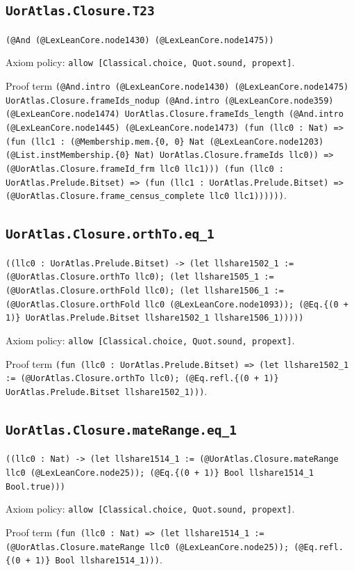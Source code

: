 \documentclass[11pt]{article}
\begin{document}
\subsection*{\texttt{UorAtlas.Closure.T23}}
\noindent\texttt{(@And (@LexLeanCore.node1430) (@LexLeanCore.node1475))}\par
\noindent Axiom policy: \texttt{allow [Classical.choice, Quot.sound, propext]}.\par
\noindent Proof term \texttt{(@And.intro (@LexLeanCore.node1430) (@LexLeanCore.node1475) UorAtlas.Closure.frameIds\_nodup (@And.intro (@LexLeanCore.node359) (@LexLeanCore.node1474) UorAtlas.Closure.frameIds\_length (@And.intro (@LexLeanCore.node1445) (@LexLeanCore.node1473) (fun (llc0 : Nat) => (fun (llc1 : (@Membership.mem.\{0, 0\} Nat (@LexLeanCore.node1203) (@List.instMembership.\{0\} Nat) UorAtlas.Closure.frameIds llc0)) => (@UorAtlas.Closure.frameId\_frm llc0 llc1))) (fun (llc0 : UorAtlas.Prelude.Bitset) => (fun (llc1 : UorAtlas.Prelude.Bitset) => (@UorAtlas.Closure.frame\_census\_complete llc0 llc1))))))}.\par
\subsection*{\texttt{UorAtlas.Closure.orthTo.eq\_1}}
\noindent\texttt{((llc0 : UorAtlas.Prelude.Bitset) -> (let llshare1502\_1 := (@UorAtlas.Closure.orthTo llc0); (let llshare1505\_1 := (@UorAtlas.Closure.orthFold llc0); (let llshare1506\_1 := (@UorAtlas.Closure.orthFold llc0 (@LexLeanCore.node1093)); (@Eq.\{(0 + 1)\} UorAtlas.Prelude.Bitset llshare1502\_1 llshare1506\_1)))))}\par
\noindent Axiom policy: \texttt{allow [Classical.choice, Quot.sound, propext]}.\par
\noindent Proof term \texttt{(fun (llc0 : UorAtlas.Prelude.Bitset) => (let llshare1502\_1 := (@UorAtlas.Closure.orthTo llc0); (@Eq.refl.\{(0 + 1)\} UorAtlas.Prelude.Bitset llshare1502\_1)))}.\par
\subsection*{\texttt{UorAtlas.Closure.mateRange.eq\_1}}
\noindent\texttt{((llc0 : Nat) -> (let llshare1514\_1 := (@UorAtlas.Closure.mateRange llc0 (@LexLeanCore.node25)); (@Eq.\{(0 + 1)\} Bool llshare1514\_1 Bool.true)))}\par
\noindent Axiom policy: \texttt{allow [Classical.choice, Quot.sound, propext]}.\par
\noindent Proof term \texttt{(fun (llc0 : Nat) => (let llshare1514\_1 := (@UorAtlas.Closure.mateRange llc0 (@LexLeanCore.node25)); (@Eq.refl.\{(0 + 1)\} Bool llshare1514\_1)))}.\par
\end{document}
